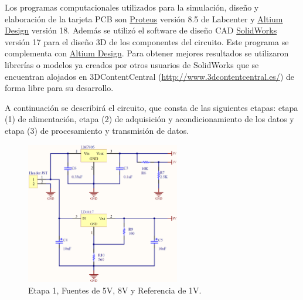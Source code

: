 Los programas computacionales utilizados para la simulación, diseño y elaboración de la tarjeta PCB son \href{https://www.labcenter.com/}{Proteus} versión 8.5 de Labcenter y \href{https://www.altium.com/altium-designer/es}{Altium Design} versión 18. Además se utilizó el software de diseño CAD \href{http://www.solidworks.es/}{SolidWorks} versión 17 para el diseño 3D de los componentes del circuito. Este programa se complementa con \href{https://www.altium.com/altium-designer/es}{Altium Design}. Para obtener mejores resultados se utilizaron librerías o modelos ya creados por otros usuarios de SolidWorks que se encuentran alojados en 3DContentCentral (\href{http://www.3dcontentcentral.es/}{http://www.3dcontentcentral.es/}) de forma libre para su desarrollo.

A continuación se describirá el circuito, que consta de las siguientes etapas: etapa (1) de alimentación, etapa (2) de adquisición y acondicionamiento de los datos y etapa (3) de procesamiento y transmisión de datos.

\begin{figure}[H]
\centering
\includegraphics[width=0.6\textwidth]{./image/CircuitoFuente.png}
\caption{Etapa 1, Fuentes de 5V, 8V y Referencia de 1V.}
\label{fig:EtapaFuente}
\end{figure}

